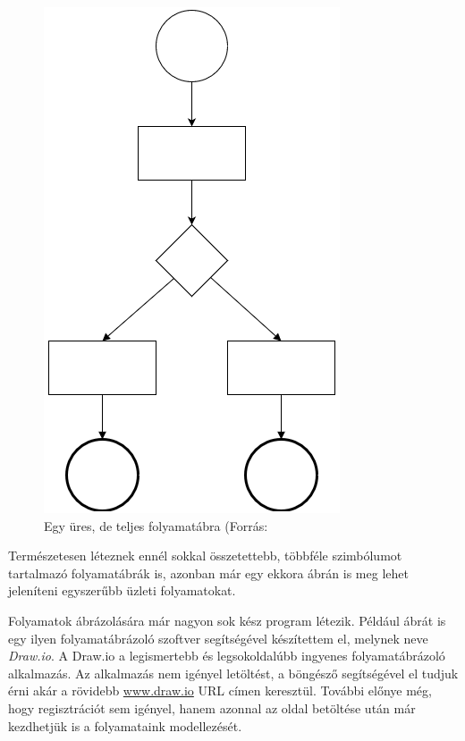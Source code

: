 \begin{figure}[h]
\centering
\includegraphics[scale=0.8]{images/uresfolyamat.png}
\caption{Egy üres, de teljes folyamatábra (Forrás: \cite{drawio}}
\label{fig:uresfolyamat}
\end{figure}

Természetesen léteznek ennél sokkal összetettebb, többféle szimbólumot tartalmazó folyamatábrák is, azonban már egy ekkora ábrán is meg lehet jeleníteni egyszerűbb üzleti folyamatokat.



Folyamatok ábrázolására már nagyon sok kész program létezik. Például  ábrát is egy ilyen folyamatábrázoló szoftver segítségével készítettem el, melynek neve \textit{Draw.io}\cite{drawio}. A Draw.io a legismertebb és legsokoldalúbb ingyenes folyamatábrázoló alkalmazás. Az alkalmazás nem igényel letöltést, a böngésző segítségével el tudjuk érni akár a rövidebb \url{www.draw.io} URL címen keresztül. További előnye még, hogy regisztrációt sem igényel, hanem azonnal az oldal betöltése után már kezdhetjük is a folyamataink modellezését.


